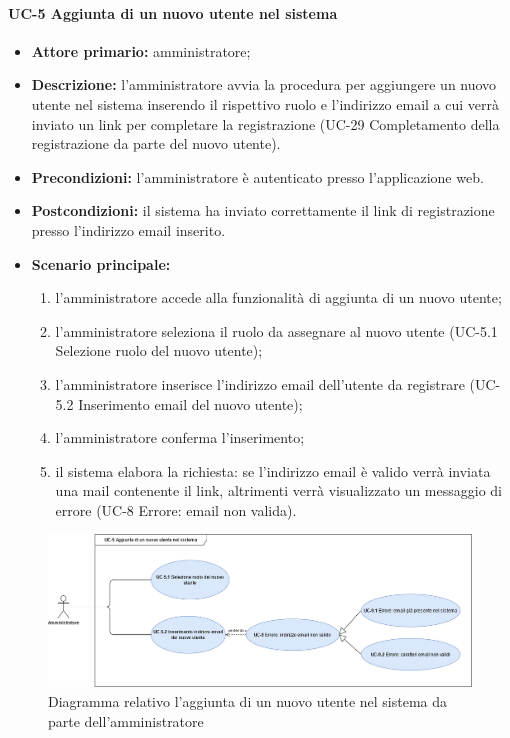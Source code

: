 \paragraph{UC-5 Aggiunta di un nuovo utente nel sistema}
\begin{itemize}
    \item \textbf{Attore primario:} amministratore; 

    \item \textbf{Descrizione:} l'amministratore avvia la procedura per aggiungere un nuovo utente nel sistema inserendo il rispettivo ruolo e l'indirizzo email a cui verrà inviato un link per completare la registrazione (UC-29 Completamento della registrazione da parte del nuovo utente).

    \item \textbf{Precondizioni:} l'amministratore è  autenticato presso l'applicazione web.

    \item \textbf{Postcondizioni:} il sistema ha inviato correttamente il link di registrazione presso l'indirizzo email inserito.

    \item \textbf{Scenario principale:}
          \begin{enumerate}
              \item l'amministratore accede alla funzionalità di aggiunta di un nuovo utente;
              \item l'amministratore seleziona il ruolo da assegnare al nuovo utente (UC-5.1 Selezione ruolo del nuovo utente);
              \item l'amministratore inserisce l'indirizzo email dell'utente da registrare (UC-5.2 Inserimento email del nuovo utente);
              \item l'amministratore conferma l'inserimento;
              \item il sistema elabora la richiesta: se l'indirizzo email è valido verrà inviata una mail contenente il link, altrimenti verrà visualizzato un messaggio di errore (UC-8 Errore: email non valida).
          \end{enumerate}
\end{itemize}
\begin{figure}[H]
    \centering
      \includegraphics[scale=0.35]{src/CasiDUso/immagini/NuovoUtenteAdmin.png}
    \caption{Diagramma relativo l'aggiunta di un nuovo utente nel sistema da parte dell'amministratore}
\end{figure}

